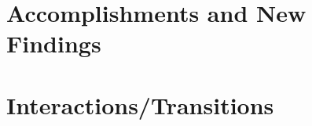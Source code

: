 \documentclass[12pt]{article}
\begin{document}
               
	      




	     
               \section{Accomplishments and New Findings}

               

%






\section{Interactions/Transitions}





                 \nocite{nk_pos_real_pass,nk_nl_ctrl_design,nk_resilient1,nk_resilient2,jp_online_stability,gh_truetime,ee_panecs}
                 \nocite{jp_esmol,jp_incr_cycles1,jp_incr_cycles2}
                 \nocite{HG_num_opt_ctrl,ss_coll_avoid,5509627,5399494,JG_hyb_sys_aerial,JD_conf_dyn_prog} 
                 \nocite{Bhave:views,Kapinski:incr_bound_sys,Althoff:reachability,Bhave:consistency, PZ_smc}
                 \nocite{hj_eff_sat,emc_model_checking,hj_craig_interp}
                 \nocite{Clarke:smc,Zuliani:rare_event,ar_arch,ab_arch}
                 \nocite{WB:10,WB:11,WB:09,MWB:11,MWB:10,MB:12,MB:10,WBIterBel:10,WBFastmpc:10,WBFastmpc:08,BPCPE:10}
                 \nocite{jm_codegen_rt_conv_opt}
\end{document}
